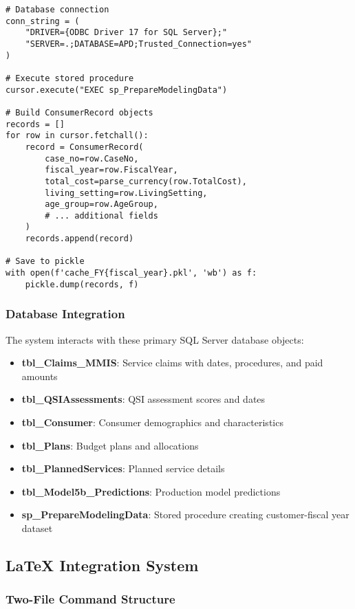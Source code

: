 \begin{verbatim}
# Database connection
conn_string = (
    "DRIVER={ODBC Driver 17 for SQL Server};"
    "SERVER=.;DATABASE=APD;Trusted_Connection=yes"
)

# Execute stored procedure
cursor.execute("EXEC sp_PrepareModelingData")

# Build ConsumerRecord objects
records = []
for row in cursor.fetchall():
    record = ConsumerRecord(
        case_no=row.CaseNo,
        fiscal_year=row.FiscalYear,
        total_cost=parse_currency(row.TotalCost),
        living_setting=row.LivingSetting,
        age_group=row.AgeGroup,
        # ... additional fields
    )
    records.append(record)

# Save to pickle
with open(f'cache_FY{fiscal_year}.pkl', 'wb') as f:
    pickle.dump(records, f)
\end{verbatim}

\subsubsection{Database Integration}

The system interacts with these primary SQL Server database objects:

\begin{itemize}
    \item \textbf{tbl\_Claims\_MMIS}: Service claims with dates, procedures, and paid amounts
    \item \textbf{tbl\_QSIAssessments}: QSI assessment scores and dates
    \item \textbf{tbl\_Consumer}: Consumer demographics and characteristics
    \item \textbf{tbl\_Plans}: Budget plans and allocations
    \item \textbf{tbl\_PlannedServices}: Planned service details
    \item \textbf{tbl\_Model5b\_Predictions}: Production model predictions
    \item \textbf{sp\_PrepareModelingData}: Stored procedure creating customer-fiscal year dataset
\end{itemize}

\subsection{LaTeX Integration System}

\subsubsection{Two-File Command Structure}

